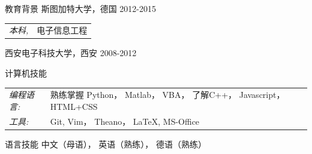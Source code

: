 \documentclass{resume} %
\begin{document}
\begin{CJK*}{UTF8}{gbsn}
\begin{rSection}{教育背景}
斯图加特大学，德国 \hfill 2012-2015\\
\clearpage
\begin{tabular}{l l}
{\sl 本科,} & 电子信息工程\\
\end{tabular}

西安电子科技大学，西安 \hfill  2008-2012\\



\end{rSection}

\begin{rSection}{计算机技能}
\begin{tabular}{l l}
{\sl 编程语言:} &熟练掌握 Python， Matlab， VBA， 了解C++， Javascript， HTML+CSS\\
{\sl 工具:} &Git, Vim， Theano， \LaTeX{}, MS-Office
\end{tabular}

\end{rSection}

\begin{rSection}{语言技能}
中文（母语）， 英语（熟练）， 德语（熟练）
\end{rSection}




% 
% 


\end{CJK*}
\end{document}
